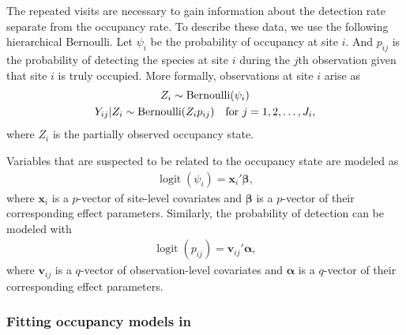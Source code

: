 \documentclass[article,shortnames]{jss}
\DeclareMathOperator{\logit}{logit}
\DeclareMathOperator{\Bern}{Bernoulli}
\newcommand{\um}{\pkg{unmarked}}
\begin{document}
The repeated visits are necessary to gain information about the
detection rate separate from the occupancy rate.  To describe these
data, we use the following hierarchical Bernoulli.  Let $\psi_i$ be
the probability of occupancy at site $i$.  And $p_{ij}$ is the
probability of detecting the species at site $i$ during the $j$th
observation given that site $i$ is truly occupied.  More formally,
observations at site $i$ arise as
\begin{gather}
Z_i \sim \Bern(\psi_i) \\
Y_{ij}|Z_i \sim \Bern(Z_i p_{ij})\text{\quad for $j=1,2,\dots,J_{i}$},
\end{gather}
where $Z_i$ is the partially observed occupancy state.

Variables that are suspected to be related to the occupancy state are
modeled as
\begin{gather}
  \logit(\psi_i) = \mathbf x_i' \mathbf \beta,
\end{gather}
where $\mathbf x_i$ is a $p$-vector of site-level covariates and $\mathbf \beta$
is a $p$-vector of their corresponding effect parameters.  Similarly, the
probability of detection can be modeled with
\begin{gather}
  \logit(p_{ij}) = \mathbf v_{ij}' \mathbf \alpha,
\end{gather}
where $\mathbf v_{ij}$ is a $q$-vector of observation-level covariates and
$\mathbf \alpha$ is a $q$-vector of their corresponding effect parameters.

\subsubsection[Fitting occupancy models in unmarked]{Fitting occupancy models in \um}
\end{document}
